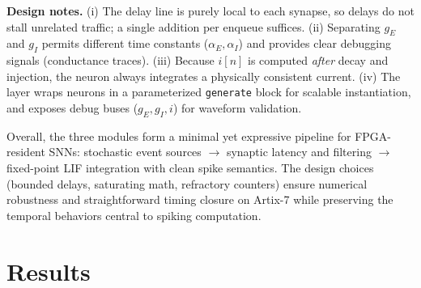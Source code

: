 \documentclass[10pt,onecolumn]{IEEEtran}
\begin{document}
\noindent
\textbf{Design notes.} (i) The delay line is purely local to each synapse, so delays do not stall unrelated traffic; a single addition per enqueue suffices. (ii) Separating \(g_E\) and \(g_I\) permits different time constants (\(\alpha_E, \alpha_I\)) and provides clear debugging signals (conductance traces). (iii) Because \(i[n]\) is computed \emph{after} decay and injection, the neuron always integrates a physically consistent current. (iv) The layer wraps neurons in a parameterized \verb|generate| block for scalable instantiation, and exposes debug buses (\(g_E, g_I, i\)) for waveform validation.

\medskip
Overall, the three modules form a minimal yet expressive pipeline for FPGA-resident SNNs: stochastic event sources \(\rightarrow\) synaptic latency and filtering \(\rightarrow\) fixed-point LIF integration with clean spike semantics. The design choices (bounded delays, saturating math, refractory counters) ensure numerical robustness and straightforward timing closure on Artix-7 while preserving the temporal behaviors central to spiking computation.

\FloatBarrier
\section{Results}
\label{sec:testbenches}
\end{document}
